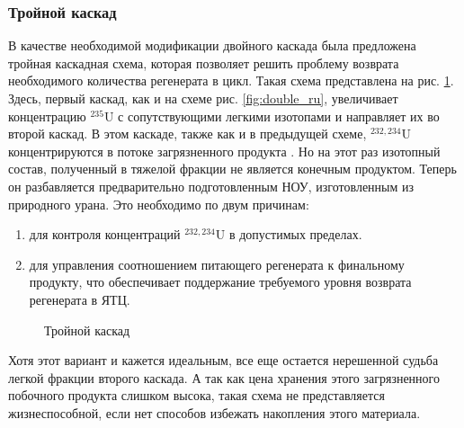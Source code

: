 \subsubsection{Тройной каскад}
В качестве необходимой модификации двойного каскада была предложена тройная каскадная схема, которая позволяет решить проблему возврата необходимого количества регенерата в цикл.
Такая схема представлена на рис. \ref{fig:triple}.
Здесь, первый каскад, как и на схеме рис. \ref{fig:double_ru}, увеличивает концентрацию $^{235}$U с сопутствующими легкими изотопами и направляет их во второй каскад.
В этом каскаде, также как и в предыдущей схеме, $^{232,234}$U концентрируются в потоке загрязненного продукта \cite{smirnovObogashchenieRegenerirovannogoUrana2018}.
Но на этот раз изотопный состав, полученный в тяжелой фракции не является конечным продуктом. 
Теперь он разбавляется предварительно подготовленным НОУ, изготовленным из природного урана.
Это необходимо по двум причинам:
\begin{enumerate}
  \item для контроля концентраций $^{232,234}$U в допустимых пределах.
  \item для управления соотношением питающего регенерата к финальному продукту, что обеспечивает поддержание требуемого уровня возврата регенерата в ЯТЦ.
\end{enumerate}

\begin{figure}[ht]
  \caption{Тройной каскад}\label{fig:triple}
\end{figure}

Хотя этот вариант и кажется идеальным, все еще остается нерешенной судьба легкой фракции второго каскада.
А так как цена хранения этого загрязненного побочного продукта слишком высока, такая схема не представляется жизнеспособной, если нет способов избежать накопления этого материала. 

